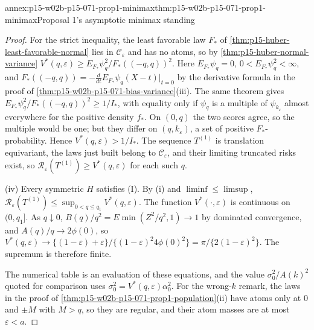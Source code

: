 \begin{annexitem}{annex:p15-w02b-p15-071-prop1-minimax}{thm:p15-w02b-p15-071-prop1-minimax}{Proposal 1's asymptotic minimax standing}
\begin{proof}
For the strict inequality, the least favorable law \(F_*\) of
\cref{thm:p15-huber-least-favorable-normal} lies in
\(\mathcal C_\varepsilon\) and has no atoms, so by
\cref{thm:p15-huber-normal-variance}
\(V^*(q,\varepsilon)\geq E_{F_*}\psi_q^2/F_*((-q,q))^2\). Here
\(E_{F_*}\psi_q=0\), \(0<E_{F_*}\psi_q^2<\infty\), and
\(F_*((-q,q))=-\frac d{dt}E_{F_*}\psi_q(X-t)|_{t=0}\) by the
derivative formula in the proof of
\cref{thm:p15-w02b-p15-071-bias-variance}(iii). The same theorem
gives \(E_{F_*}\psi_q^2/F_*((-q,q))^2\geq1/I_*\), with equality only if
\(\psi_q\) is a multiple of \(\psi_{k_\varepsilon}\) almost everywhere
for the positive density \(f_*\). On \((0,q)\) the two scores agree, so
the multiple would be one; but they differ on
\((q,k_\varepsilon)\), a set of positive \(F_*\)-probability.
Hence \(V^*(q,\varepsilon)>1/I_*\).
The sequence \(T^{(1)}\) is translation equivariant, the laws just
built belong to \(\mathcal C_\varepsilon\), and their limiting
truncated risks exist, so
\(\mathcal R_\varepsilon(T^{(1)})\geq V^*(q,\varepsilon)\) for each
such \(q\).

(iv) Every symmetric \(H\) satisfies (I). By (i) and
\(\liminf\leq\limsup\),
\(\mathcal R_\varepsilon(T^{(1)})\leq\sup_{0<q\leq q_1}V^*(q,\varepsilon)\).
The function \(V^*(\cdot,\varepsilon)\) is continuous on \((0,q_1]\).
As \(q\downarrow0\), \(B(q)/q^2=E\min(Z^2/q^2,1)\to1\) by dominated
convergence, and \(A(q)/q\to2\phi(0)\), so
\(V^*(q,\varepsilon)\to\{(1-\varepsilon)+\varepsilon\}/\{(1-\varepsilon)^2
4\phi(0)^2\}=\pi/\{2(1-\varepsilon)^2\}\). The supremum is therefore
finite.

The numerical table is an evaluation of these equations, and the
value \(\sigma_0^2/A(k)^2\) quoted for comparison uses
\(\sigma_0^2=V^*(q,\varepsilon)\alpha_0^2\). For the wrong-\(k\)
remark, the laws in the proof of
\cref{thm:p15-w02b-p15-071-prop1-population}(ii) have atoms only at
\(0\) and \(\pm M\) with \(M>q\), so they are regular, and their atom
masses are at most \(\varepsilon<a\).
\end{proof}
\end{annexitem}

